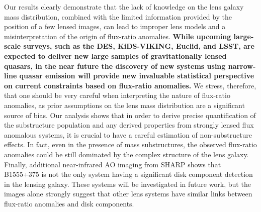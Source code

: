 \documentclass[useAMS,usenatbib]{mnras}
\begin{document}
Our results clearly
demonstrate that the lack of knowledge on the lens galaxy mass
distribution, combined with the limited information provided by the
position of a few lensed images, can lead to improper lens models and
a misinterpretation of the origin of flux-ratio anomalies. \textbf{While upcoming large-scale surveys, such as the DES, KiDS-VIKING, Euclid, and LSST, are expected to
deliver new large samples of gravitationally lensed quasars, in the
near future the discovery of new systems using narrow-line quasar
emission \citep{N14} will provide new invaluable statistical
perspective on current constraints based on flux-ratio anomalies.} We stress,
therefore, that one should be very careful when interpreting the
nature of flux-ratio anomalies, as prior assumptions on the lens mass
distribution are a significant source of bias. Our analysis shows that
in order to derive precise quantification of the substructure
population and any derived properties from strongly lensed flux
anomalous systems, it is crucial to have a careful estimation of
non-substructure effects. In fact, even in the presence of mass
substructures, the observed flux-ratio anomalies could be still
dominated by the complex structure of the lens galaxy. Finally,
additional near-infrared AO imaging from SHARP shows that B1555+375 is
not the only system having a significant disk component detection in
the lensing galaxy.  These systems will be investigated in future
work, but the images alone strongly suggest that other lens systems
have similar links between flux-ratio anomalies and disk components.
\end{document}
